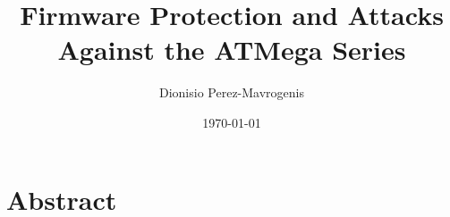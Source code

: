 \documentclass[12pt,a4paper,twocolumn]{article}
\author{Dionisio Perez-Mavrogenis}
\title{Firmware Protection and Attacks Against the ATMega Series}
\date{\today}
\begin{document}
	\maketitle
	
	\section*{Abstract}

	
		
	
\end{document}
